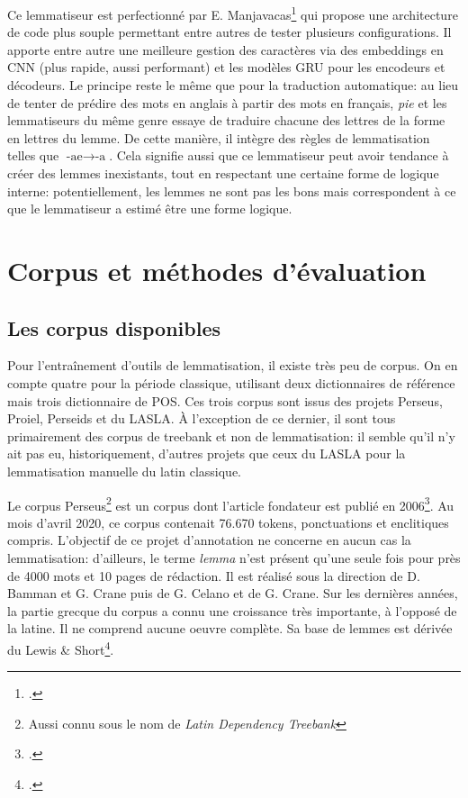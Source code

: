Ce lemmatiseur est perfectionné par E. Manjavacas\footcite{manjavacas_improving_2019} qui propose une architecture de code plus souple permettant entre autres de tester plusieurs configurations. Il apporte entre autre une meilleure gestion des caractères via des embeddings en CNN (plus rapide, aussi performant) et les modèles GRU pour les encodeurs et décodeurs. Le principe reste le même que pour la traduction automatique: au lieu de tenter de prédire des mots en anglais à partir des mots en français, \textit{pie} et les lemmatiseurs du même genre essaye de traduire chacune des lettres de la forme en lettres du lemme. De cette manière, il intègre des règles de lemmatisation telles que $\textrm{-ae} \rightarrow \textrm{-a}$. Cela signifie aussi que ce lemmatiseur peut avoir tendance à créer des lemmes inexistants, tout en respectant une certaine forme de logique interne: potentiellement, les lemmes ne sont pas les bons mais correspondent à ce que le lemmatiseur a estimé être une forme logique. %

\section{Corpus et méthodes d'évaluation}
\label{subsec:lemma_corpus}

\subsection{Les corpus disponibles}

Pour l'entraînement d'outils de lemmatisation, il existe très peu de corpus. On en compte quatre pour la période classique, utilisant deux dictionnaires de référence mais trois dictionnaire de POS. Ces trois corpus sont issus des projets Perseus, Proiel, Perseids et du LASLA. À l'exception de ce dernier, il sont tous primairement des corpus de treebank et non de lemmatisation: il semble qu'il n'y ait pas eu, historiquement, d'autres projets que ceux du LASLA pour la lemmatisation manuelle du latin classique.

Le corpus Perseus\footnote{Aussi connu sous le nom de \textit{Latin Dependency Treebank}} est un corpus dont l'article fondateur est publié en 2006\footcite{bamman_design_2006}. Au mois d'avril 2020, ce corpus contenait 76.670 tokens, ponctuations et enclitiques compris. L'objectif de ce projet d'annotation ne concerne en aucun cas la lemmatisation: d'ailleurs, le terme \textit{lemma} n'est présent qu'une seule fois pour près de 4000 mots et 10 pages de rédaction. Il est réalisé sous la direction de D. Bamman et G. Crane puis de G. Celano et de G. Crane. Sur les dernières années, la partie grecque du corpus a connu une croissance très importante, à l'opposé de la latine. Il ne comprend aucune oeuvre complète. Sa base de lemmes est dérivée du Lewis \& Short\footcite{shorts_latin_1958}.

